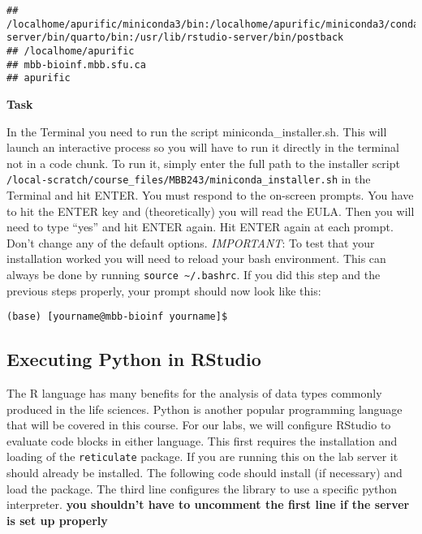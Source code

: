 \documentclass[
]{article}
\newenvironment{Shaded}{\begin{snugshade}}{\end{snugshade}}
\newcommand{\BuiltInTok}[1]{#1}
\newcommand{\VariableTok}[1]{\textcolor[rgb]{0.00,0.00,0.00}{#1}}
\begin{document}
\begin{Shaded}
\end{Shaded}

\begin{verbatim}
## /localhome/apurific/miniconda3/bin:/localhome/apurific/miniconda3/condabin:/localhome/apurific/.local/bin:/localhome/apurific/bin:/usr/bin:/usr/bin:/usr/local/sbin:/usr/local/bin:/usr/sbin:/usr/lib/rstudio-server/bin/quarto/bin:/usr/lib/rstudio-server/bin/postback
## /localhome/apurific
## mbb-bioinf.mbb.sfu.ca
## apurific
\end{verbatim}

\textbf{Task}

In the Terminal you need to run the script miniconda\_installer.sh. This
will launch an interactive process so you will have to run it directly
in the terminal not in a code chunk. To run it, simply enter the full
path to the installer script
\texttt{/local-scratch/course\_files/MBB243/miniconda\_installer.sh} in
the Terminal and hit ENTER. You must respond to the on-screen prompts.
You have to hit the ENTER key and (theoretically) you will read the
EULA. Then you will need to type ``yes'' and hit ENTER again. Hit ENTER
again at each prompt. Don't change any of the default options.
\emph{IMPORTANT}: To test that your installation worked you will need to
reload your bash environment. This can always be done by running
\texttt{source\ \textasciitilde{}/.bashrc}. If you did this step and the
previous steps properly, your prompt should now look like this:

\texttt{(base)\ {[}yourname@mbb-bioinf\ yourname{]}\$}

\hypertarget{executing-python-in-rstudio}{%
\subsection{Executing Python in
RStudio}\label{executing-python-in-rstudio}}

The R language has many benefits for the analysis of data types commonly
produced in the life sciences. Python is another popular programming
language that will be covered in this course. For our labs, we will
configure RStudio to evaluate code blocks in either language. This first
requires the installation and loading of the \texttt{reticulate}
package. If you are running this on the lab server it should already be
installed. The following code should install (if necessary) and load the
package. The third line configures the library to use a specific python
interpreter. \textbf{you shouldn't have to uncomment the first line if
the server is set up properly}
\end{document}
